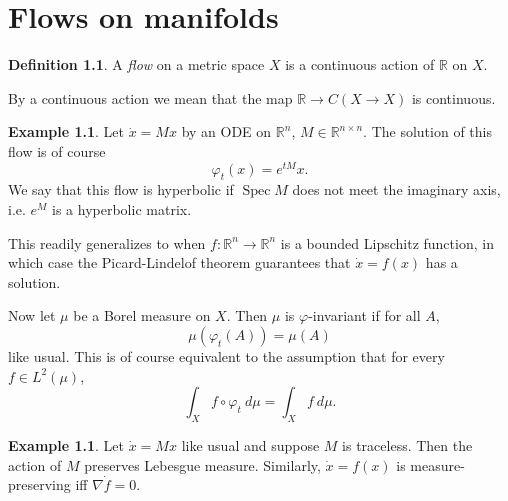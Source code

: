 \documentclass[12pt]{report}
\newcommand{\RR}{\mathbb{R}}
\newcommand{\Spec}{\operatorname{Spec}}
\newcommand{\dfn}[1]{\emph{#1}\index{#1}}
\theoremstyle{definition}
\newtheorem{definition}[theorem]{Definition}
\newtheorem{example}[theorem]{Example}
\begin{document}
\chapter{Flows on manifolds}
\begin{definition}
A \dfn{flow} on a metric space $X$ is a continuous action of $\RR$ on $X$.
\end{definition}
By a continuous action we mean that the map $\RR \to C(X \to X)$ is continuous.
\begin{example}
Let $\dot x = Mx$ by an ODE on $\RR^n$, $M \in \RR^{n \times n}$. The solution of this flow is of course
$$\varphi_t(x) = e^{tM}x.$$
We say that this flow is hyperbolic if $\Spec M$ does not meet the imaginary axis, i.e. $e^M$ is a hyperbolic matrix.

This readily generalizes to when $f: \RR^n \to \RR^n$ is a bounded Lipschitz function, in which case the Picard-Lindelof theorem guarantees that $\dot x = f(x)$ has a solution.
\end{example}
Now let $\mu$ be a Borel measure on $X$. Then $\mu$ is $\varphi$-invariant if for all $A$,
$$\mu(\varphi_t(A))=\mu(A)$$
like usual. This is of course equivalent to the assumption that for every $f \in L^2(\mu)$,
$$\int_X f \circ \varphi_t~d\mu = \int_X f~d\mu.$$
\begin{example}
Let $\dot x = Mx$ like usual and suppose $M$ is traceless. Then the action of $M$ preserves Lebesgue measure. Similarly, $\dot x = f(x)$ is measure-preserving iff $\nabla \dot f = 0$.
\end{example}
\end{document}
